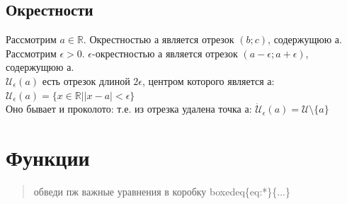 \documentclass[oneside]{book}
\begin{document}
\begin{enumerate}
\section{Окрестности}

Рассмотрим $a \in \mathbb{R}$. Окрестностью а является отрезок $(b; c)$, содержущюю а.
Рассмотрим $\epsilon > 0$. $\epsilon$-окрестностью а является отрезок $(a-\epsilon; a+\epsilon)$, содержущюю а.\\
$\mathcal{U}_\epsilon(a)$ есть отрезок длиной  $2\epsilon$, центром которого является а: \\
$\mathcal{U}_\epsilon(a) = \{x \in \mathbb{R} | |x-a|< \epsilon\}$\\
Оно бывает и проколото: т.е. из отрезка удалена точка а: $\dot{\mathcal{U}}_\epsilon(a) = \mathcal{U} \setminus \{a\}$

\chapter{Функции}
\begin{quote}
    обведи пж важные уравнения в коробку boxedeq\{eq:*\}\{...\}
\end{quote}


\end{enumerate}
\end{document}
